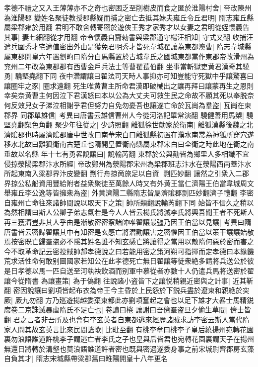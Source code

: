 孝德不禮之又入王薄薄亦不之奇也密困乏至削樹皮而食之匿於淮陽村舍|{
	帝改陳州為淮陽郡}
變姓名聚徒教授郡縣疑而捕之密亡去抵其妹夫雍丘令丘君明|{
	隋志雍丘縣屬梁郡雍於用翻}
君明不敢舍轉寄密於遊俠王秀才家秀才以女妻之君明從姪懷義告其事|{
	妻七細翻從才用翻}
帝令懷義自齎勑書與梁郡通守楊汪相知|{
	守式又翻}
收捕汪遣兵圍秀才宅適值密出外由是獲免君明秀才皆死韋城翟讓為東都灋曹|{
	隋志韋城縣屬東郡開皇六年置劉昫曰隋分白馬縣置於古城韋氏之國城東都當作東郡帝改滑州為兖州二年改為東郡郡有西曹金戶兵法士等曹翟萇伯翻}
坐事當斬獄吏黄君漢奇其驍勇|{
	驍堅堯翻下同}
夜中濳謂讓曰翟法司天時人事抑亦可知豈能守死獄中乎讓驚喜曰讓圈牢之豕|{
	圈求遠翻}
死生唯黄曹主所命君漢即破械出之讓再拜曰讓蒙再生之恩則幸矣奈黄曹主何因泣下君漢怒曰本以公為大丈夫可救生民之命故不顧其死以奉脱奈何反效兒女子涕泣相謝乎君但努力自免勿憂吾也讓遂亡命於瓦崗為羣盗|{
	瓦崗在東郡界}
同郡單雄信|{
	考異曰唐書云雄信曹州人今從河洛記單常演翻}
驍健善用馬槊|{
	驍堅堯翻槊色角翻}
聚少年往從之|{
	少詩照翻}
離狐徐世勣家於衛南|{
	離狐漢縣後魏之北濟隂郡也時屬濟隂郡唐中世改曰南華宋白曰離狐縣初置在濮水南常為神狐所穿穴遂移水北故曰離狐衛南古楚丘也隋開皇置衛南縣屬東郡宋白曰全衛之時此地在衛之南垂故以名縣}
年十七有勇畧說讓曰|{
	說輸芮翻}
東郡於公與勣皆為鄉里人多相識不宜侵掠滎陽梁郡汴水所經|{
	帝改鄭州為滎陽郡宋州為梁郡班志汴水在滎陽西南蓋汴水所起東南入梁郡界汴皮變翻}
剽行舟掠啇旅足以自資|{
	剽匹妙翻}
讓然之引衆入二郡界掠公私船資用豐給附者益衆聚徒至萬餘人時又有外黄王當仁濟陽王伯當韋城周文舉雍丘李公逸等皆擁衆為盗|{
	外黄濟陽二縣隋志皆屬濟隂郡剽匹妙翻濟子禮翻}
李密自雍州亡命往來諸帥間說以取天下之策|{
	帥所類翻說輸芮翻下同}
始皆不信久之稍以為然相謂曰斯人公卿子弟志氣若是今人人皆云楊氏將滅李氏將興吾聞王者不死斯人再三獲濟豈非其人乎由是漸敬密密察諸帥唯翟讓最彊乃因王伯當以見讓|{
	考異曰隋唐書皆云密歸翟讓其中有知密是玄感亡將潜勸讓害之密懼因王伯當以策干讓讓始敬焉按密既亡歸羣盗必不隱其姓名誰不知玄感亡將讓得之當用以敵隋何惡於密而害之今不取革命記云密投賊帥郝孝德說之曰若能用密之策河朔可指揮而定孝德曰本緣饑荒求活性命何敢别圖國家若知公在此孝德死亡無日翟讓等徒衆絶多請將兵送公於彼是日孝德以馬一匹自送至河執袂飲酒而别軍中慕從者亦數十人仍遣兵馬將送密於翟讓今從隋書}
為讓畫策|{
	為于偽翻}
往說諸小盗皆下之讓悦稍親近密與之計事|{
	近其靳翻}
密因說讓曰劉項皆起布衣為帝王今主昏於上民怨於下鋭兵盡於遼東和親絶於突厥|{
	厥九勿翻}
方乃廵遊揚越委棄東都此亦劉項奮起之會也以足下雄才大畧士馬精鋭席卷二京誅滅暴虐隋氏不足亡也|{
	卷讀曰棬}
讓謝曰吾儕羣盗旦夕偷生草間|{
	儕士皆翻}
君之言者非吾所及也會有李玄英者自東都逃來經歷諸賊求訪李密云斯人當代隋家人問其故玄英言比來民間謠歌|{
	比毗至翻}
有桃李章曰桃李子皇后繞揚州宛轉花園裏勿浪語誰道許桃李子謂逃亡者李氏之子也皇與后皆君也宛轉花園裏謂天子在揚州無還日將轉於溝壑也莫浪語誰道許者密也既與密遇遂委身事之前宋城尉齊郡房玄藻自負其才|{
	隋志宋城縣帶梁郡舊曰睢陽開皇十八年更名}
